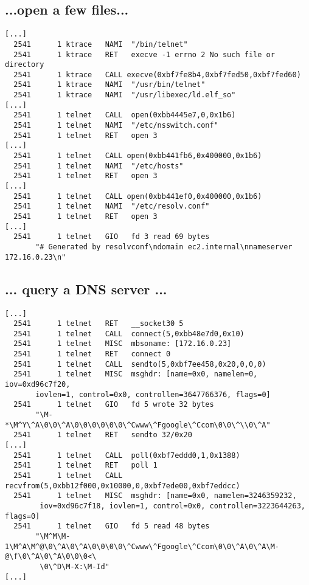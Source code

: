 \documentclass[xga]{xdvislides}
\newcommand{\smallish}{\fontsize{16}{16}\selectfont}
\begin{document}
\subsection{...open a few files...}
\smallish
\begin{verbatim}
[...]
  2541      1 ktrace   NAMI  "/bin/telnet"
  2541      1 ktrace   RET   execve -1 errno 2 No such file or directory
  2541      1 ktrace   CALL execve(0xbf7fe8b4,0xbf7fed50,0xbf7fed60)
  2541      1 ktrace   NAMI  "/usr/bin/telnet"
  2541      1 ktrace   NAMI  "/usr/libexec/ld.elf_so"
[...]
  2541      1 telnet   CALL  open(0xbb4445e7,0,0x1b6)
  2541      1 telnet   NAMI  "/etc/nsswitch.conf"
  2541      1 telnet   RET   open 3
[...]
  2541      1 telnet   CALL open(0xbb441fb6,0x400000,0x1b6)
  2541      1 telnet   NAMI  "/etc/hosts"
  2541      1 telnet   RET   open 3
[...]
  2541      1 telnet   CALL open(0xbb441ef0,0x400000,0x1b6)
  2541      1 telnet   NAMI  "/etc/resolv.conf"
  2541      1 telnet   RET   open 3
[...]
  2541      1 telnet   GIO   fd 3 read 69 bytes
       "# Generated by resolvconf\ndomain ec2.internal\nnameserver 172.16.0.23\n"
\end{verbatim}
\Normalsize

\subsection{... query a DNS server ...}
\smallish
\begin{verbatim}
[...]
  2541      1 telnet   RET   __socket30 5
  2541      1 telnet   CALL  connect(5,0xbb48e7d0,0x10)
  2541      1 telnet   MISC  mbsoname: [172.16.0.23]
  2541      1 telnet   RET   connect 0
  2541      1 telnet   CALL  sendto(5,0xbf7ee458,0x20,0,0,0)
  2541      1 telnet   MISC  msghdr: [name=0x0, namelen=0, iov=0xd96c7f20,
       iovlen=1, control=0x0, controllen=3647766376, flags=0]
  2541      1 telnet   GIO   fd 5 wrote 32 bytes
       "\M-*\M^Y\^A\0\0\^A\0\0\0\0\0\0\^Cwww\^Fgoogle\^Ccom\0\0\^\\0\^A"
  2541      1 telnet   RET   sendto 32/0x20
[...]
  2541      1 telnet   CALL  poll(0xbf7eddd0,1,0x1388)
  2541      1 telnet   RET   poll 1
  2541      1 telnet   CALL  recvfrom(5,0xbb12f000,0x10000,0,0xbf7ede00,0xbf7eddcc)
  2541      1 telnet   MISC  msghdr: [name=0x0, namelen=3246359232,
        iov=0xd96c7f18, iovlen=1, control=0x0, controllen=3223644263, flags=0]
  2541      1 telnet   GIO   fd 5 read 48 bytes
       "\M^M\M-1\M^A\M^@\0\^A\0\^A\0\0\0\0\^Cwww\^Fgoogle\^Ccom\0\0\^A\0\^A\M-@\f\0\^A\0\^A\0\0\0<\
        \0\^D\M-X:\M-Id"
[...]
\end{verbatim}
\Normalsize
\end{document}
